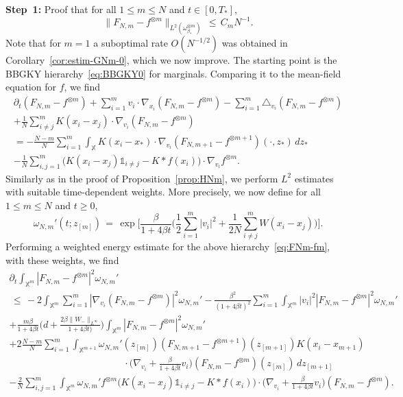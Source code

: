 \documentclass[a4paper,11pt,reqno,noindent]{amsart}
\theoremstyle{plain}
\theoremstyle{definition}
\numberwithin{equation}{section}
\newcommand{\Xd}{\mathbb X}
\begin{document}
\medskip\noindent
{\bf Step~1:} Proof that for all $1\le m\le N$ and $t\in[0,T_*]$,
\begin{equation}\label{eq:prop-chaos}
\|F_{N,m}-f^{\otimes m}\|_{L^2(\omega_{\beta_*}^{\otimes m})}\,\le\,C_mN^{-1}.
\end{equation}
Note that for $m=1$ a suboptimal rate $O(N^{-1/2})$ was obtained in Corollary~\ref{cor:estim-GNm-0}, which we now improve.
The starting point is the BBGKY hierarchy~\eqref{eq:BBGKY0} for marginals. Comparing it to the mean-field equation for $f$, we find
\begin{multline}\label{eq:FNm-fm}
\partial_t(F_{N,m}-f^{\otimes m})+\sum_{i=1}^mv_i\cdot\nabla_{x_i}(F_{N,m}-f^{\otimes m})
-\sum_{i=1}^m\triangle_{v_i}(F_{N,m}-f^{\otimes m})\\
+\frac1N\sum_{i\ne j}^mK(x_i-x_j)\cdot\nabla_{v_i}(F_{N,m}-f^{\otimes m})\\
=-\frac{N-m}N\sum_{i=1}^m\int_\Xd K(x_i-x_*)\cdot\nabla_{v_i}(F_{N,m+1}-f^{\otimes m+1})(\cdot,z_*)\,dz_*\\
-\frac1N\sum_{i, j=1}^m\big(K(x_i-x_j)\mathds1_{i\ne j}-K\ast f(x_i)\big)\cdot\nabla_{v_i}f^{\otimes m}.
\end{multline}
Similarly as in the proof of Proposition~\ref{prop:HNm}, we perform $L^2$ estimates with suitable time-dependent weights. More precisely, we now define for all $1\le m\le N$ and $t\ge0$,
\[\omega_{N,m}'(t;z_{[m]})\,=\,\exp\bigg[\frac\beta{1+4\beta t}\bigg(\frac12\sum_{i=1}^m|v_i|^2+\frac1{2N}\sum_{i\ne j}^mW(x_i-x_j)\bigg)\bigg].\]
Performing a weighted energy estimate for the above hierarchy~\eqref{eq:FNm-fm}, with these weights, we find
\begin{multline*}
\partial_t\int_{\Xd^m}|F_{N,m}-f^{\otimes m}|^2\omega_{N,m}'\\
\,\le\,
-2\int_{\Xd^m}\sum_{i=1}^m|\nabla_{v_i}(F_{N,m}-f^{\otimes m})|^2\omega_{N,m}'
-\frac{\beta^2}{(1+4\beta t)^2}\sum_{i=1}^m\int_{\Xd^m}|v_i|^2|F_{N,m}-f^{\otimes m}|^2\omega_{N,m}'\\
+\frac{m\beta}{1+4\beta t}\Big(d+\frac{2\beta\|W_-\|_{L^\infty}}{1+4\beta t)}\Big)\int_{\Xd^m}|F_{N,m}-f^{\otimes m}|^2\omega_{N,m}'\\
+2\frac{N-m}N\sum_{i=1}^m\int_{\Xd^{m+1}}\omega_{N,m}'(z_{[m]})(F_{N,m+1}-f^{\otimes m+1})(z_{[m+1]})K(x_i-x_{m+1})\\
\hspace{5cm}\cdot\Big(\nabla_{v_i}+\frac{\beta}{1+4\beta t}v_i\Big)(F_{N,m}-f^{\otimes m})(z_{[m]})\,dz_{[m+1]} \\
-\frac2N\sum_{i, j=1}^m\int_{\Xd^m}\omega_{N,m}'f^{\otimes m}\big(K(x_i-x_j)\mathds1_{i\ne j}-K\ast f(x_i)\big)\cdot\Big(\nabla_{v_i}+\frac\beta{1+4\beta t}v_i\Big)(F_{N,m}-f^{\otimes m}).
\end{multline*}
\end{document}
